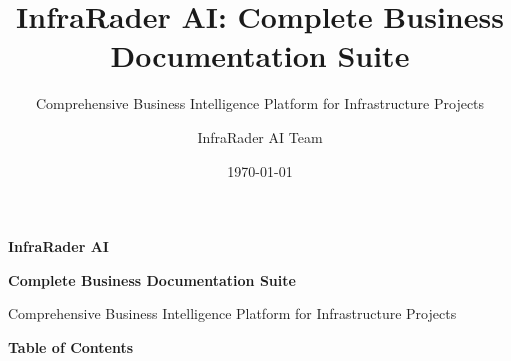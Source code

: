 \documentclass[11pt,a4paper]{book}
\title{InfraRader AI: Complete Business Documentation Suite}
\subtitle{Comprehensive Business Intelligence Platform for Infrastructure Projects}
\author{InfraRader AI Team}
\date{\today}
\begin{document}
\begin{titlepage}
    \centering
    \vspace*{2cm}
    
    {\color{InfraRaderBlue}\Huge\bfseries InfraRader AI}\par
    \vspace{0.5cm}
    
    {\color{InfraRaderDarkGrey}\Large\bfseries Complete Business Documentation Suite}\par
    \vspace{0.3cm}
    
    {\color{InfraRaderLightGrey}\large Comprehensive Business Intelligence Platform for Infrastructure Projects}\par
    
    \vspace{2cm}
    
    {\Large\bfseries Table of Contents}\par
    \vspace{1cm}
    

\end{titlepage}
\end{document}
